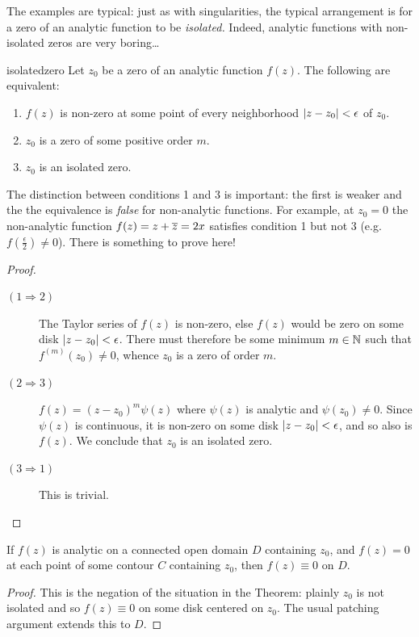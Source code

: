 The examples are typical: just as with singularities, the typical arrangement is for a zero of an analytic function to be \emph{isolated.} Indeed, analytic functions with non-isolated zeros are very boring\ldots

\begin{thm}{}{isolatedzero}
Let $z_0$ be a zero of an analytic function $f(z)$. The following are equivalent:
\begin{enumerate}
  \item $f(z)$ is non-zero at some point of every neighborhood $\left| z-z_0\right|<\epsilon$ of $z_0$.
  \item $z_0$ is a zero of some positive order $m$.
  \item $z_0$ is an isolated zero.
\end{enumerate}
\end{thm}

The distinction between conditions 1 and 3 is important: the first is weaker and the the equivalence is \emph{false} for non-analytic functions. For example, at $z_0=0$ the non-analytic function $f(z)=z+\overline{z}=2x$ satisfies condition 1 but not 3 (e.g.\ $f(\frac\epsilon 2)\neq 0$). There is something to prove here!

\begin{proof}
\begin{description}
  \item[$(1\Rightarrow 2)$]\quad The Taylor series of $f(z)$ is non-zero, else $f(z)$ would be zero on some disk $\left| z-z_0\right|<\epsilon$. There must therefore be some minimum $m\in\mathbb{N}$ such that $f^{(m)}(z_0)\neq 0$, whence $z_0$ is a zero of order $m$.
	\item[$(2\Rightarrow 3)$]\quad $f(z)=(z-z_0)^m\psi(z)$ where $\psi(z)$ is analytic and $\psi(z_0)\neq 0$. Since $\psi(z)$ is continuous, it is non-zero on some disk $\left| z-z_0\right|<\epsilon$, and so also is $f(z)$. We conclude that $z_0$ is an isolated zero.
	\item[$(3\Rightarrow 1)$]\quad This is trivial.\qedhere
\end{description}
\end{proof}

\begin{cor}{}{}
If $f(z)$ is analytic on a connected open domain $D$ containing $z_0$, and $f(z)=0$ at each point of some contour $C$ containing $z_0$, then $f(z)\equiv 0$ on $D$.
\end{cor}
 
\begin{proof}
This is the negation of the situation in the Theorem: plainly $z_0$ is not isolated and so $f(z)\equiv 0$ on some disk centered on $z_0$. The usual patching argument extends this to $D$.
\end{proof}

